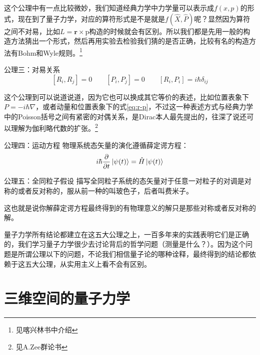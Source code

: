 \documentclass[a4paper,zihao=-4,linespread=1]{ctexrep}
\begin{document}
	这个公理中有一点比较微妙，我们知道经典力学中力学量可以表示成$f(x,p)$的形式，现在到了量子力学，对应的算符形式是不是就是$f(\hat{X},\hat{P})$呢？显然因为算符之间不对易，比如$L=\mathbf{r}\times\mathrm{p}$构造的时候就会有区别。所以我们都是先用一般的构造方法猜出一个形式，然后再用实验去检验我们猜的是否正确，比较有名的构造方法有Bohm和Wyle规则。\footnote{见喀兴林书中介绍}
	\begin{theorem}{公理三：对易关系}
		\begin{equation}
			\left[R_i,R_j\right]=0\qquad 	\left[P_i,P_j\right]=0\qquad\left[R_i,P_i\right]=i\hbar \delta_{ij}
		\end{equation}
	\end{theorem}

	这个公理到可以说道说道，因为它也可以换成其它等价的表述，比如位置表象下$P=-i\hbar\nabla$，或者动量和位置表象下的式\ref{eq:r-p}，不过这一种表述方式与经典力学中的Poisson括号之间有紧密的对偶关系，是Dirac本人最先提出的，往深了说还可以理解为伽利略代数的扩张。\footnote{见A.Zee群论书}
	
	\begin{theorem}{公理四：运动方程}
		物理系统态矢量的演化遵循薛定谔方程：
		\begin{equation}
			i\hbar\frac{\partial }{\partial t}\ket{\psi(t)}=\hat{H}\ket{\psi(t)}
		\end{equation}
	\end{theorem}
	\begin{theorem}{公理五：全同粒子假设}
		描写全同粒子系统的态矢量对于任意一对粒子的对调是对称的或者反对称的，服从前一种的叫玻色子，后者叫费米子。
	\end{theorem}
	这也就是说你解薛定谔方程最终得到的有物理意义的解只是那些对称或者反对称的解。
	
	量子力学所有结论都建立在这五大公理之上，一百多年来的实践表明它们是正确的，我们学习量子力学很少去讨论背后的哲学问题（测量是什么？）。因为这个问题是所谓公理以下的问题，不论我们相信量子论的哪种诠释，最终得到的结论都依赖于这五大公理，从实用主义上看不会有区别。
	
	
	
    \chapter{三维空间的量子力学}
\end{document}

